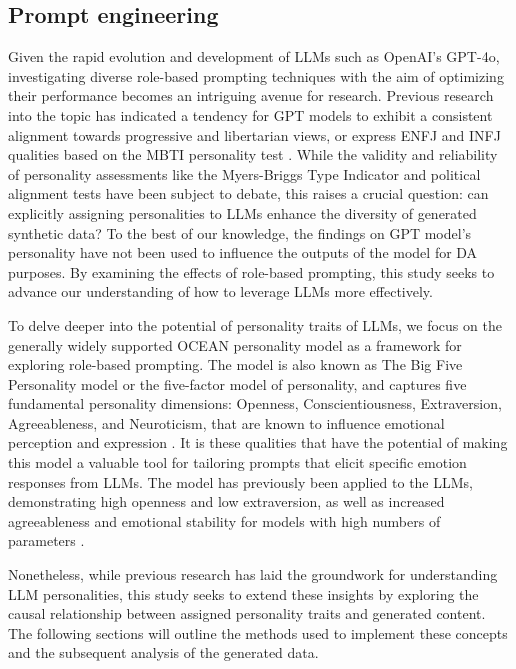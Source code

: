 \documentclass[manuscript]{clv3}
\begin{document}
\subsection{Prompt engineering}
Given the rapid evolution and development of LLMs such as OpenAI's GPT-4o, investigating diverse role-based prompting techniques with the aim of optimizing their performance becomes an intriguing avenue for research. Previous research into the topic has indicated a tendency for GPT models to exhibit a consistent alignment towards progressive and libertarian views, or express ENFJ and INFJ qualities based on the MBTI personality test \cite{rutinowski2023selfperception}. While the validity and reliability of personality assessments like the Myers-Briggs Type Indicator and political alignment tests have been subject to debate, this raises a crucial question: can explicitly assigning personalities to LLMs enhance the diversity of generated synthetic data? To the best of our knowledge, the findings on GPT model's personality have not been used to influence the outputs of the model for DA purposes. By examining the effects of role-based prompting, this study seeks to advance our understanding of how to leverage LLMs more effectively.

To delve deeper into the potential of personality traits of LLMs, we focus on the generally widely supported OCEAN \cite{structure_of_phenotypic_personality_traits, validation_of_the_five_factor_model} personality model as a framework for exploring role-based prompting. The model is also known as The Big Five Personality model or the five-factor model of personality, and captures five fundamental personality dimensions: Openness, Conscientiousness, Extraversion, Agreeableness, and Neuroticism, that are known to influence emotional perception and expression \cite{hilliard2024elicitingpersonalitytraitslarge}. It is these qualities that have the potential of making this model a valuable tool for tailoring prompts that elicit specific emotion responses from LLMs. The model has previously been applied to the LLMs, demonstrating high openness and low extraversion, as well as increased agreeableness and emotional stability for models with high numbers of parameters \cite{hilliard2024elicitingpersonalitytraitslarge}.

Nonetheless, while previous research has laid the groundwork for understanding LLM personalities, this study seeks to extend these insights by exploring the causal relationship between assigned personality traits and generated content. The following sections will outline the methods used to implement these concepts and the subsequent analysis of the generated data.
\end{document}

